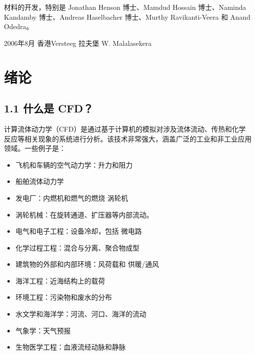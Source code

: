 \documentclass[11pt,a4paper,openany,fontset=none]{ctexbook}
\begin{document}
材料的开发，特别是 Jonathan Henson 博士、Mamdud Hossain 博士、Naminda Kandamby 博士、Andreas Haselbacher 博士、Murthy Ravikanti-Veera 和 Anand Odedra。

2006年8月 香港Versteeg 拉夫堡 W. Malalasekera

\tableofcontents

\mainmatter

\chapter{绪论}

\section*{1.1 什么是 CFD？}

计算流体动力学（CFD）是通过基于计算机的模拟对涉及流体流动、传热和化学反应等相关现象的系统进行分析。该技术非常强大，涵盖广泛的工业和非工业应用领域。一些例子是：

\begin{itemize}

\item 飞机和车辆的空气动力学：升力和阻力

\item 船舶流体动力学

\item 发电厂：内燃机和燃气的燃烧 涡轮机

\item 涡轮机械：在旋转通道、扩压器等内部流动。

\item 电气和电子工程：设备冷却，包括 微电路

\item 化学过程工程：混合与分离、聚合物成型

\item 建筑物的外部和内部环境：风荷载和 供暖/通风

\item 海洋工程：近海结构上的载荷

\item 环境工程：污染物和废水的分布

\item 水文学和海洋学：河流、河口、海洋的流动

\item 气象学：天气预报

\item 生物医学工程：血液流经动脉和静脉

\end{itemize}
\end{document}
